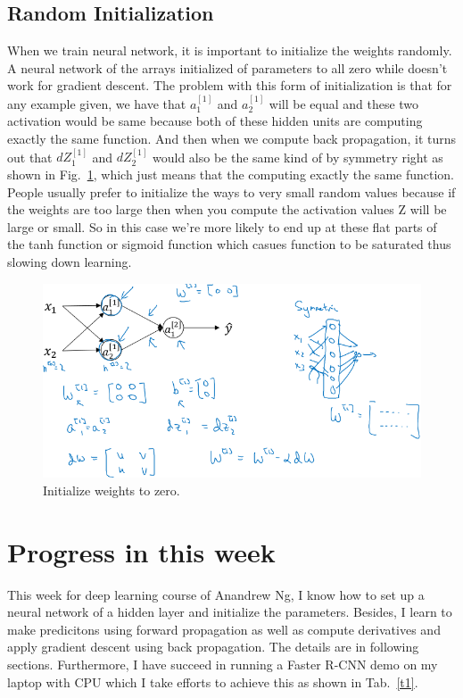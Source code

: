 \documentclass[a4paper]{article}
\begin{document}
\subsection{Random Initialization}
When we train neural network, it is important to initialize the weights randomly. A neural network of the arrays initialized of parameters to all zero while doesn't work for gradient descent. The problem with this form of initialization is that for any example given, we have that $a^{[1]}_1$ and $a^{[1]}_2$ will be equal and these two activation would be same because both of these hidden units are computing exactly the same function. And then when we compute back propagation, it turns out that $dZ^{[1]}_1$ and $dZ^{[1]}_2$ would also be the same kind of by symmetry right as shown in Fig.~\ref{p17}, which just means that the computing exactly the same function. People usually prefer to initialize the ways to very small random values because if the weights are too large then when you compute the activation values Z will be large or small. So in this case we're more likely to end up at these flat parts of the tanh function or sigmoid function which casues function to be saturated thus slowing down learning.
 \begin{figure}
 	\begin{center}
 		\includegraphics[scale=0.4]{figures/19.png}
 	\end{center}
 	\caption{Initialize weights to zero.}
 	\label{p17}
 \end{figure}


\section{Progress in this week}

This week for deep learning course of Anandrew Ng, I know how to set up a neural network of a hidden layer and initialize the parameters. Besides, I learn to make predicitons using forward propagation as well as compute derivatives and apply gradient descent using back propagation. The details are in following sections. Furthermore, I have succeed in running a Faster R-CNN demo on my laptop with CPU which I take efforts to achieve this as shown in Tab.~\ref{t1}.
\end{document}
